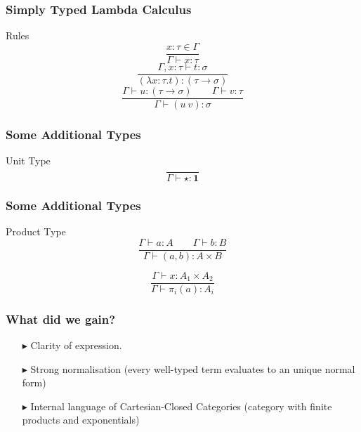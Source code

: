 \documentclass[14pt,compress]{beamer}
\begin{document}
\begin{frame}\label{frame : rules of simply typed lambda calculus}
\frametitle{Simply Typed Lambda Calculus}

\begin{block}{Rules}
\pause
\[ \frac{x{:}\tau \in \Gamma}{\Gamma \vdash x{:}\tau} \]
\pause
\[ \frac{\Gamma, x{:}\tau \vdash {t}:\sigma}{(\lambda x{:}\tau.t) : (\tau \to \sigma)} \]
\pause
\[ \frac{\Gamma \vdash u{:}(\tau \to \sigma) \qquad \Gamma \vdash v{:}\tau}
        {\Gamma \vdash (u\ v){:}\sigma} \]
\end{block}
\end{frame}

\begin{frame}\label{frame : unit type}
\frametitle{Some Additional Types}

\begin{block}{Unit Type}
\[ \frac{}{\Gamma \vdash \star {:} \mathbf{1}} \]
\end{block}
\end{frame}

\begin{frame}\label{frame : product type}
\frametitle{Some Additional Types}

\begin{block}{Product Type}
\[ \frac{\Gamma \vdash a {:} A \qquad \Gamma \vdash b {:} B}
        {\Gamma \vdash (a{,}b){:}A{\times} B} \]
        
\[ \frac{\Gamma \vdash x{:}A_1{\times} A_2}{\Gamma \vdash \pi_i(a){:}A_i} \]        
\end{block}
\end{frame}

\begin{frame}\label{frame : what did we gain}
\frametitle{What did we gain?}
\begin{enumerate}
\pause
\item[$\blacktriangleright$] \textcolor{beamer@mathtext}{Clarity of expression}.
\pause
\item[$\blacktriangleright$] \textcolor{beamer@mathtext}{Strong normalisation}
  (every well-typed term evaluates to an unique normal form)
\pause
\item[$\blacktriangleright$] \textcolor{beamer@mathtext}{Internal language of Cartesian-Closed Categories}
(category with finite products and exponentials)   
\end{enumerate}

\end{frame}
\end{document}
